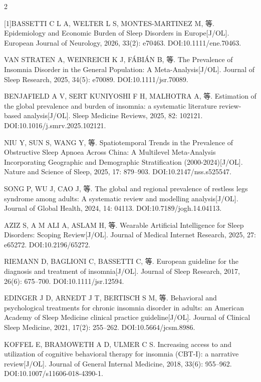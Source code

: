 \documentclass[UTF8,zihao=5,fontset=none]{ctexart}
\newcommand{\song}{\CJKfamily{song}}
\newcommand{\hei}{\CJKfamily{hei}}
\begin{document}
\begin{multicols}{2}
\vspace{8pt}\noindent{\hei\fontsize{10pt}{16pt}\selectfont\bfseries 参考文献}\par\vspace{2pt}
{\song\fontsize{9pt}{15pt}\selectfont\setlength{\parindent}{0pt}\setlength{\parskip}{1pt}
[1]\quad BASSETTI C L A, WELTER L S, MONTES-MARTINEZ M, 等. Epidemiology and Economic Burden of Sleep Disorders in Europe[J/OL]. European Journal of Neurology, 2026, 33(2): e70463. DOI:10.1111/ene.70463.\par
[2]\quad VAN STRATEN A, WEINREICH K J, FÁBIÁN B, 等. The Prevalence of Insomnia Disorder in the General Population: A Meta-Analysis[J/OL]. Journal of Sleep Research, 2025, 34(5): e70089. DOI:10.1111/jsr.70089.\par
[3]\quad BENJAFIELD A V, SERT KUNIYOSHI F H, MALHOTRA A, 等. Estimation of the global prevalence and burden of insomnia: a systematic literature review-based analysis[J/OL]. Sleep Medicine Reviews, 2025, 82: 102121. DOI:10.1016/j.smrv.2025.102121.\par
[4]\quad NIU Y, SUN S, WANG Y, 等. Spatiotemporal Trends in the Prevalence of Obstructive Sleep Apnoea Across China: A Multilevel Meta-Analysis Incorporating Geographic and Demographic Stratification (2000-2024)[J/OL]. Nature and Science of Sleep, 2025, 17: 879--903. DOI:10.2147/nss.s525547.\par
[5]\quad SONG P, WU J, CAO J, 等. The global and regional prevalence of restless legs syndrome among adults: A systematic review and modelling analysis[J/OL]. Journal of Global Health, 2024, 14: 04113. DOI:10.7189/jogh.14.04113.\par
[6]\quad AZIZ S, A M ALI A, ASLAM H, 等. Wearable Artificial Intelligence for Sleep Disorders: Scoping Review[J/OL]. Journal of Medical Internet Research, 2025, 27: e65272. DOI:10.2196/65272.\par
[7]\quad RIEMANN D, BAGLIONI C, BASSETTI C, 等. European guideline for the diagnosis and treatment of insomnia[J/OL]. Journal of Sleep Research, 2017, 26(6): 675--700. DOI:10.1111/jsr.12594.\par
[8]\quad EDINGER J D, ARNEDT J T, BERTISCH S M, 等. Behavioral and psychological treatments for chronic insomnia disorder in adults: an American Academy of Sleep Medicine clinical practice guideline[J/OL]. Journal of Clinical Sleep Medicine, 2021, 17(2): 255--262. DOI:10.5664/jcsm.8986.\par
[9]\quad KOFFEL E, BRAMOWETH A D, ULMER C S. Increasing access to and utilization of cognitive behavioral therapy for insomnia (CBT-I): a narrative review[J/OL]. Journal of General Internal Medicine, 2018, 33(6): 955--962. DOI:10.1007/s11606-018-4390-1.\par
}
\end{multicols}
\end{document}

